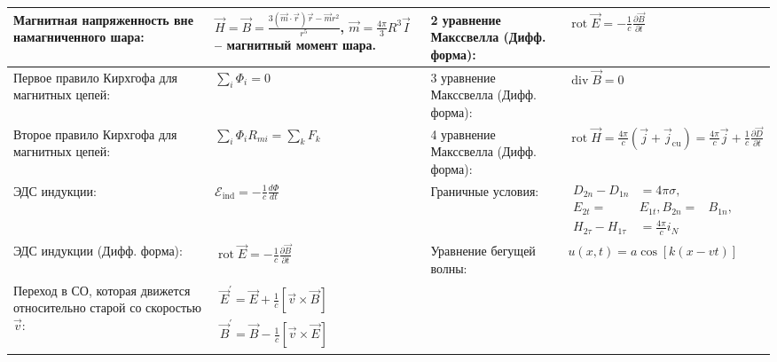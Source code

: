 \documentclass{article}
\begin{document}
\begin{tabular}{ |p{6cm}|p{3.5cm}|p{6cm}|p{3.5cm}|  }
\hline
Магнитная напряженность вне намагниченного шара:                           &
$\vec{H}=\vec{B}=\frac{3(\vec{m} \cdot \vec{r}) \vec{r}-\vec{m} r^{2}}{r^{5}}$,
$\vec{m}=\frac{4 \pi}{3} R^{3} \vec{I}$ -- магнитный момент шара.          &
2 уравнение Макссвелла (Дифф. форма):                                      &
$\operatorname{rot} \vec{E}=-\frac{1}{c} \frac{\partial \vec{B}}{\partial t}$\\
\hline
Первое правило Кирхгофа для магнитных цепей:                               &
$\sum_{i} \Phi_{i}=0$                                                      &
3 уравнение Макссвелла (Дифф. форма):                                      &
$\operatorname{div} \vec{B}=0$                                             \\
\hline
Второе правило Кирхгофа для магнитных цепей:                               &
$\sum_{i} \Phi_{i} R_{m i}=\sum_{k} F_{k}$                                 &
4 уравнение Макссвелла (Дифф. форма):                                      &
$\operatorname{rot} \vec{H}=\frac{4 \pi}{c}\left(\vec{j}+\vec{j}_{\mathrm{cu}}\right)=\frac{4 \pi}{c} \vec{j}+\frac{1}{c} \frac{\partial \vec{D}}{\partial t}$\\
\hline
ЭДС индукции:                                                              &
$\mathcal{E}_{\mathrm{ind}}=-\frac{1}{c} \frac{d \Phi}{d t}$               &
Граничные условия:                                                         &
$\begin{aligned}
D_{2 n}-D_{1 n} &=4 \pi \sigma, \\
E_{2 t}=& E_{1 t}, B_{2 n}=& B_{1 n}, \\
H_{2 \tau}-H_{1 \tau} &=\frac{4 \pi}{c} i_{N}
\end{aligned}$                                                             \\
\hline
ЭДС индукции (Дифф. форма):                                                &
$\operatorname{rot}\vec{E}=-\frac{1}{c} \frac{\partial \vec{B}}{\partial t}$ &
Уравнение бегущей волны:                                                   &
$u(x, t)=a \cos [k(x-v t)]$                                                \\
\hline
Переход в СО, которая движется относительно старой со скоростью $\vec{v}$: &
$\begin{aligned}
\vec{E}^{\prime}=\vec{E}+\frac{1}{c} [\vec{v} \times \vec{B}] \\
\vec{B}^{\prime}=\vec{B}-\frac{1}{c} [\vec{v} \times \vec{E}]
\end{aligned}$                                                             &

\end{tabular}
\end{document}
